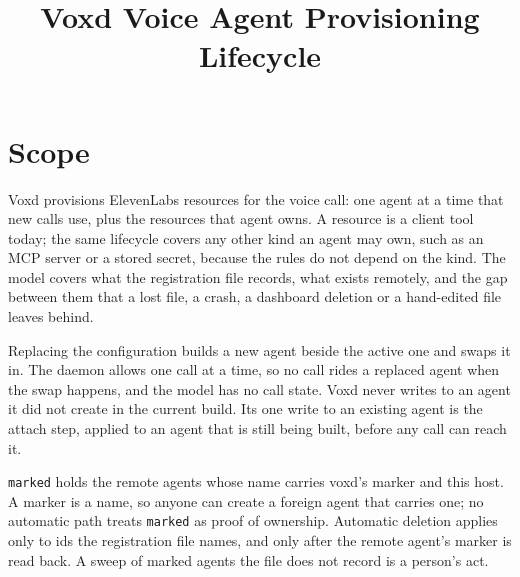 \documentclass[a4paper,10pt,fleqn]{article}
\begin{document}
\title{Voxd Voice Agent Provisioning Lifecycle}
\maketitle

\section{Scope}

Voxd provisions ElevenLabs resources for the voice call: one agent at a
time that new calls use, plus the resources that agent owns. A resource is
a client tool today; the same lifecycle covers any other kind an agent may
own, such as an MCP server or a stored secret, because the rules do not
depend on the kind. The model covers what the registration file records,
what exists remotely, and the gap between them that a lost file, a crash, a
dashboard deletion or a hand-edited file leaves behind.

Replacing the configuration builds a new agent beside the active one and
swaps it in. The daemon allows one call at a time, so no call rides a
replaced agent when the swap happens, and the model has no call state.
Voxd never writes to an agent it did not create in the current build. Its
one write to an existing agent is the attach step, applied to an agent that
is still being built, before any call can reach it.

\texttt{marked} holds the remote agents whose name carries voxd's marker and
this host. A marker is a name, so anyone can create a foreign agent that
carries one; no automatic path treats \texttt{marked} as proof of
ownership. Automatic deletion applies only to ids the registration file
names, and only after the remote agent's marker is read back. A sweep of
marked agents the file does not record is a person's act.

\begin{zed}
\end{zed}
\end{document}
